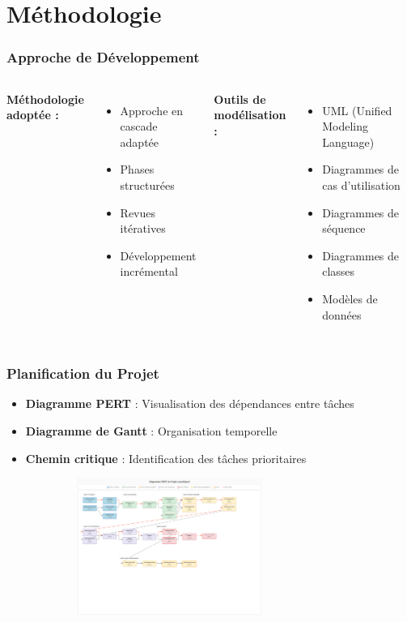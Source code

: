 \documentclass{beamer}
\begin{document}
\section{Méthodologie}

\begin{frame}
\frametitle{Approche de Développement}
\begin{columns}
\textbf{Méthodologie adoptée :}
\begin{itemize}
    \item Approche en cascade adaptée
    \item Phases structurées
    \item Revues itératives
    \item Développement incrémental
\end{itemize}

\textbf{Outils de modélisation :}
\begin{itemize}
    \item UML (Unified Modeling Language)
    \item Diagrammes de cas d'utilisation
    \item Diagrammes de séquence
    \item Diagrammes de classes
    \item Modèles de données
\end{itemize}
\end{columns}
\end{frame}

\begin{frame}
\frametitle{Planification du Projet}
\begin{itemize}
    \item \textbf{Diagramme PERT} : Visualisation des dépendances entre tâches
    \item \textbf{Diagramme de Gantt} : Organisation temporelle
    \item \textbf{Chemin critique} : Identification des tâches prioritaires
\end{itemize}
\begin{center}
    \includegraphics[width=0.8\textwidth,height=4.5cm,keepaspectratio]{images/gestion_projet/pert_diagram.png}
\end{center}
\end{frame}
\end{document}

